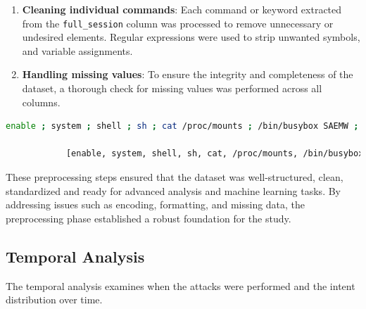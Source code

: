 \begin{enumerate}
            \item \textbf{Cleaning individual commands}: Each command or keyword extracted from the \texttt{full\_session} column was processed to remove unnecessary or undesired elements. Regular expressions were used to strip unwanted symbols, and variable assignments. 
            
            \vspace{0.2em}
            
            \item \textbf{Handling missing values}: 
            To ensure the integrity and completeness of the dataset, a thorough check for missing values was performed across all columns.
            
        \end{enumerate}
        
        \begin{lstlisting}[language=sh, caption={Dataset Processing}, label={lst:dataset-processing}]
            enable ; system ; shell ; sh ; cat /proc/mounts ; /bin/busybox SAEMW ; cd /dev/shm ; cat .s || cp /bin/echo .s ; /bin/busybox SAEMW ; tftp ; wget ; /bin/busybox SAEMW ; dd bs=52 count=1 if=.s || cat .s || while read i ; do echo $i ; done < .s ; /bin/busybox SAEMW ; rm .s ; exit ;
            
            [enable, system, shell, sh, cat, /proc/mounts, /bin/busybox, SAEMW, cd, /dev/shm, cat, .s, cp, /bin/echo, .s, /bin/busybox, SAEMW, tftp, wget , /bin/busybox, SAEMW, dd, bs, count, if, cat, .s, while, read, i, do, echo, i, done, .s, /bin/busybox, SAEMW, rm, .s, exit]
        \end{lstlisting}

        These preprocessing steps ensured that the dataset was well-structured, clean, standardized and ready for advanced analysis and machine learning tasks. By addressing issues such as encoding, formatting, and missing data, the preprocessing phase established a robust foundation for the study.

    \subsection{Temporal Analysis}
    
        The temporal analysis examines when the attacks were performed and the intent distribution over time.
        
